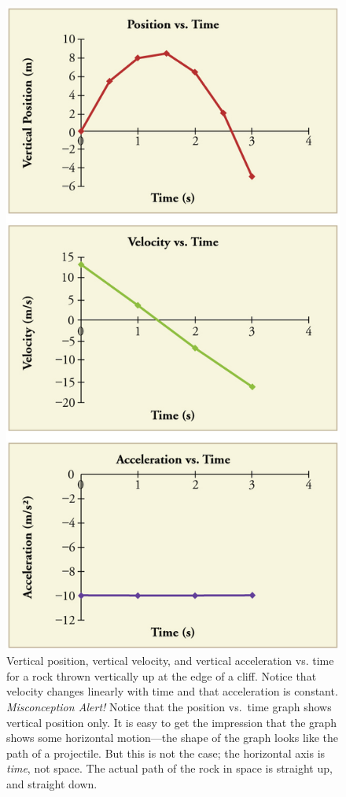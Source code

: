 \documentclass[
]{book}
\begin{document}
\begin{figure}
\hypertarget{import-auto-id4064055}{%
\centering
\includegraphics{images/Figure_02_06_01.jpg}
\caption{Vertical position, vertical velocity, and vertical acceleration vs.
time for a rock thrown vertically up at the edge of a cliff. Notice that
velocity changes linearly with time and that acceleration is constant.
\emph{Misconception Alert!} Notice that the position vs.~time graph shows
vertical position only. It is easy to get the impression that the graph
shows some horizontal motion---the shape of the graph looks like the
path of a projectile. But this is not the case; the horizontal axis is
\emph{time}, not space. The actual path of the rock in space is straight up,
and straight down.}\label{import-auto-id4064055}
}
\end{figure}
\end{document}
